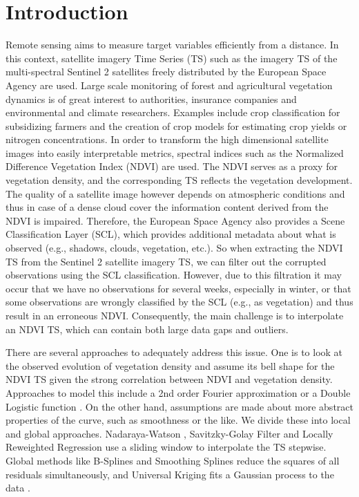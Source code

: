 \chapter{Introduction}

Remote sensing aims to measure target variables efficiently from a distance. In this context, satellite imagery Time Series ({TS}) such as the imagery {TS} of the multi-spectral Sentinel 2 satellites freely distributed by the European Space Agency are used.
Large scale monitoring of forest and agricultural vegetation dynamics is of great interest to authorities, insurance companies and environmental and climate researchers. Examples include crop classification for subsidizing farmers and the creation of crop models for estimating crop yields or nitrogen concentrations. 
In order to transform the high dimensional satellite images into easily interpretable metrics, spectral indices such as the Normalized Difference Vegetation Index (NDVI) are used. The NDVI serves as a proxy for vegetation density, and the corresponding {TS} reflects the vegetation development. 
The quality of a satellite image however depends on atmospheric conditions and thus in case of a dense cloud cover the information content derived from the NDVI is impaired. Therefore, the European Space Agency also provides a Scene Classification Layer (SCL), which provides additional metadata about what is observed (e.g., shadows, clouds, vegetation, etc.). So when extracting the NDVI {TS} from the Sentinel 2 satellite imagery {TS}, we can filter out the corrupted observations using the SCL classification. However, due to this filtration it may occur that we have no observations for several weeks, especially in winter, or that some observations are wrongly classified by the SCL (e.g., as vegetation) and thus result in an erroneous NDVI. Consequently, the main challenge is to interpolate an NDVI {TS}, which can contain both large data gaps and outliers. 

There are several approaches to adequately address this issue. One is to look at the observed evolution of vegetation density and assume its bell shape for the NDVI {TS} given the strong correlation between NDVI and vegetation density. Approaches to model this include a 2nd order Fourier approximation \citep{stockliEuropeanPlantPhenology2004} or a Double Logistic function \citep{beckImprovedMonitoringVegetation2006}.
On the other hand, assumptions are made about more abstract properties of the curve, such as smoothness or the like. We divide these into local and global approaches. Nadaraya-Watson \citep{strbacEstimationEvapotrasnpirationUrban2017}, Savitzky-Golay Filter \citep{chenSimpleMethodReconstructing2004a} and Locally Reweighted Regression \citep{omoriAssessmentPaddyFields2021} use a sliding window to interpolate the {TS} stepwise. Global methods like B-Splines \citep{gurungPredictingEnhancedVegetation2009} and Smoothing Splines \citep{caiPerformanceSmoothingMethods2017} reduce the squares of all residuals simultaneously, and Universal Kriging fits a Gaussian process to the data \citep{chandolaScalableTimeSeries2010}.


